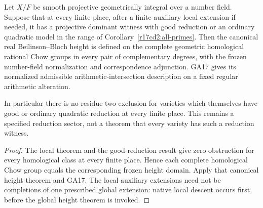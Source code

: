 \begin{corollary}
\label{r17cd2:height}
Let $X/F$ be smooth projective geometrically integral
over a number field. Suppose that at every finite place,
after a finite auxiliary local extension if needed, it
has a projective dominant witness with good reduction
or an ordinary quadratic model in the range of
Corollary~\ref{r17cd2:all-primes}.
Then the canonical real Beilinson--Bloch height is defined
on the complete geometric homological rational Chow
groups in every pair of complementary degrees, with the
frozen number-field normalization and correspondence
adjunction. GA17 gives its normalized admissible
arithmetic-intersection description on a fixed regular
arithmetic alteration.

In particular there is no residue-two exclusion for
varieties which themselves have good or ordinary quadratic
reduction at every finite place. This remains a specified
reduction sector, not a theorem that every variety has
such a reduction witness.
\end{corollary}

\begin{proof}
The local theorem and the good-reduction result give zero
obstruction for every homological class at every finite
place. Hence each complete homological Chow group equals
the corresponding frozen height domain. Apply that
canonical height theorem and GA17. The local auxiliary
extensions need not be completions of one prescribed
global extension: native local descent occurs first,
before the global height theorem is invoked.
\end{proof}
